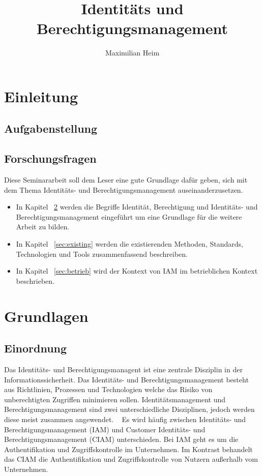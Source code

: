 \documentclass[10pt]{article}
\author{Maximilian Heim}
\title{Identitäts und Berechtigungsmanagement}
\begin{document}
\maketitle
\newpage
\tableofcontents
\newpage
\section{Einleitung}
\subsection{Aufgabenstellung}
\subsection{Forschungsfragen}
Diese Seminararbeit soll dem Leser eine gute Grundlage dafür geben, sich mit dem Thema Identitäts- und Berechtigungsmanagement auseinanderzusetzen.
\begin{itemize}
  \item In Kapitel ~\cref{sec:grundlagen} werden die Begriffe Identität, Berechtigung und Identitäts- und Berechtigungsmanagement eingeführt um eine Grundlage für die weitere Arbeit zu bilden.
  \item In Kapitel ~\cref{sec:existing} werden die existierenden Methoden, Standards, Technologien und Tools zusammenfassend beschreiben.
  \item In Kapitel ~\cref{sec:betrieb} wird der Kontext von IAM im betrieblichen Kontext beschrieben.
\end{itemize}
\section{Grundlagen}
\label{sec:grundlagen}
\subsection{Einordnung}
Das Identitäts- und Berechtigungsmanagent ist eine zentrale Disziplin in der Informationssicherheit. Das Identitäts- und Berechtigungsmanagement besteht aus Richtlinien, Prozessen und Technologien welche das Risiko von unberechtigten Zugriffen minimieren sollen. Identitätsmanagement und Berechtigungsmanagement sind zwei unterschiedliche Disziplinen, jedoch werden diese meist zusammen angewendet. ~\cite{mohammed2017systematic} Es wird häufig zwischen Identitäts- und Berechtigungsmanagement (IAM) und Customer Identitäts- und Berechtigungsmanagement (CIAM) unterschieden. Bei IAM geht es um die Authentifikation und Zugriffskontrolle im Unternehmen. Im Kontrast behandelt das CIAM die Authentifikation und Zugriffskontrolle von Nutzern außerhalb vom Unternehmen.~\cite{mohammed2017systematic} ~\cite{liveretos2022customer}
\end{document}
